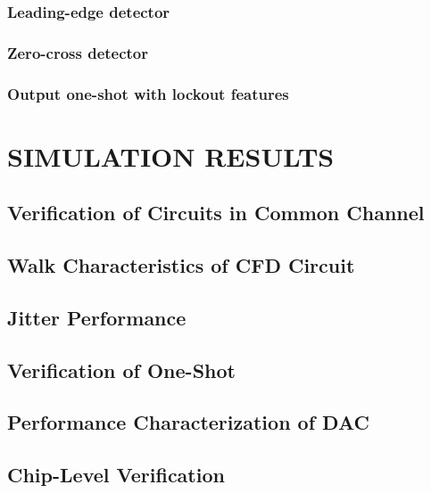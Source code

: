 \documentclass[12pt,oneside,final]{siuethesis}
\theoremstyle{definition}
\begin{document}
\subsection{Leading-edge detector}

\subsection{Zero-cross detector}


\subsection{Output one-shot with lockout features}





\chapter{SIMULATION RESULTS}

\section{Verification of Circuits in Common Channel}

\section{Walk Characteristics of CFD Circuit}

\section{Jitter Performance}

\section{Verification of One-Shot}

\section{Performance Characterization of DAC}

\section{Chip-Level Verification}
\end{document}
